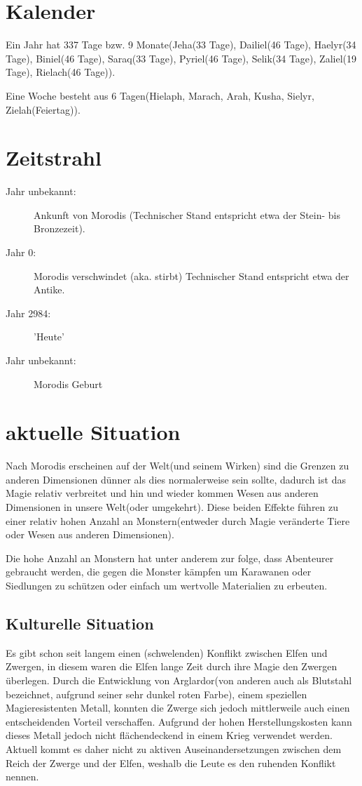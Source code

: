 \section{Kalender}
Ein Jahr hat 337 Tage bzw. 9 Monate(Jeha(33 Tage), Dailiel(46 Tage), Haelyr(34 Tage), Biniel(46 Tage), Saraq(33 Tage), Pyriel(46 Tage), Selik(34 Tage), Zaliel(19 Tage), Rielach(46 Tage)).

Eine Woche besteht aus 6 Tagen(Hielaph, Marach, Arah, Kusha, Sielyr, Zielah(Feiertag)).

\section{Zeitstrahl}
\begin{description}
	\item[Jahr unbekannt:] Ankunft von Morodis (Technischer Stand entspricht etwa der Stein- bis Bronzezeit).
	\item[Jahr 0:] Morodis verschwindet (aka. stirbt) Technischer Stand entspricht etwa der Antike.
	\item[Jahr 2984:] 'Heute'
	\item[Jahr unbekannt:] Morodis Geburt
\end{description}

\section{aktuelle Situation}
Nach Morodis erscheinen auf der Welt(und seinem Wirken) sind die Grenzen zu anderen Dimensionen dünner als dies normalerweise sein sollte, dadurch ist das Magie relativ verbreitet und hin und wieder kommen Wesen aus anderen Dimensionen in unsere Welt(oder umgekehrt).
Diese beiden Effekte führen zu einer relativ hohen Anzahl an Monstern(entweder durch Magie veränderte Tiere oder Wesen aus anderen Dimensionen).

Die hohe Anzahl an Monstern hat unter anderem zur folge, dass Abenteurer gebraucht werden, die gegen die Monster kämpfen um Karawanen oder Siedlungen zu schützen oder einfach um wertvolle Materialien zu erbeuten.

\subsection{Kulturelle Situation}
Es gibt schon seit langem einen (schwelenden) Konflikt zwischen Elfen und Zwergen, in diesem waren die Elfen lange Zeit durch ihre Magie den Zwergen überlegen. Durch die Entwicklung von Arglardor(von anderen auch als Blutstahl bezeichnet, aufgrund seiner sehr dunkel roten Farbe), einem speziellen Magieresistenten Metall, konnten die Zwerge sich jedoch mittlerweile auch einen entscheidenden Vorteil verschaffen. Aufgrund der hohen Herstellungskosten kann dieses Metall jedoch nicht flächendeckend in einem Krieg verwendet werden. Aktuell kommt es daher nicht zu aktiven Auseinandersetzungen zwischen dem Reich der Zwerge und der Elfen, weshalb die Leute es den ruhenden Konflikt nennen.

